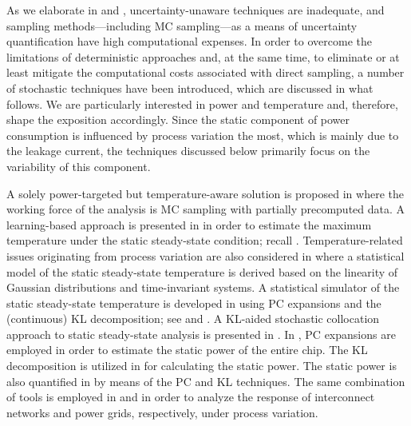 As we elaborate in  and , uncertainty-unaware
techniques are inadequate, and sampling methods---including \ac{MC}
sampling---as a means of uncertainty quantification have high computational
expenses. In order to overcome the limitations of deterministic approaches and,
at the same time, to eliminate or at least mitigate the computational costs
associated with direct sampling, a number of stochastic techniques have been
introduced, which are discussed in what follows. We are particularly interested
in power and temperature and, therefore, shape the exposition accordingly. Since
the static component of power consumption is influenced by process variation the
most, which is mainly due to the leakage current, the techniques discussed below
primarily focus on the variability of this component.

A solely power-targeted but temperature-aware solution is proposed in
\cite{chandra2010} where the working force of the analysis is \ac{MC} sampling
with partially precomputed data. A learning-based approach is presented in
\cite{juan2011} in order to estimate the maximum temperature under the static
steady-state condition; recall .
Temperature-related issues originating from process variation are also
considered in \cite{juan2012} where a statistical model of the static
steady-state temperature is derived based on the linearity of Gaussian
distributions and time-invariant systems. A statistical simulator of the static
steady-state temperature is developed in \cite{huang2009a} using \ac{PC}
expansions and the (continuous) \ac{KL} decomposition; see
 and . A \ac{KL}-aided
stochastic collocation \cite{maitre2010, xiu2010} approach to static
steady-state analysis is presented in \cite{lee2013}. In \cite{shen2009},
\ac{PC} expansions are employed in order to estimate the static power of the
entire chip. The \ac{KL} decomposition is utilized in \cite{bhardwaj2006} for
calculating the static power. The static power is also quantified in
\cite{bhardwaj2008} by means of the \ac{PC} and \ac{KL} techniques. The same
combination of tools is employed in \cite{vrudhula2006} and \cite{ghanta2006} in
order to analyze the response of interconnect networks and power grids,
respectively, under process variation.

